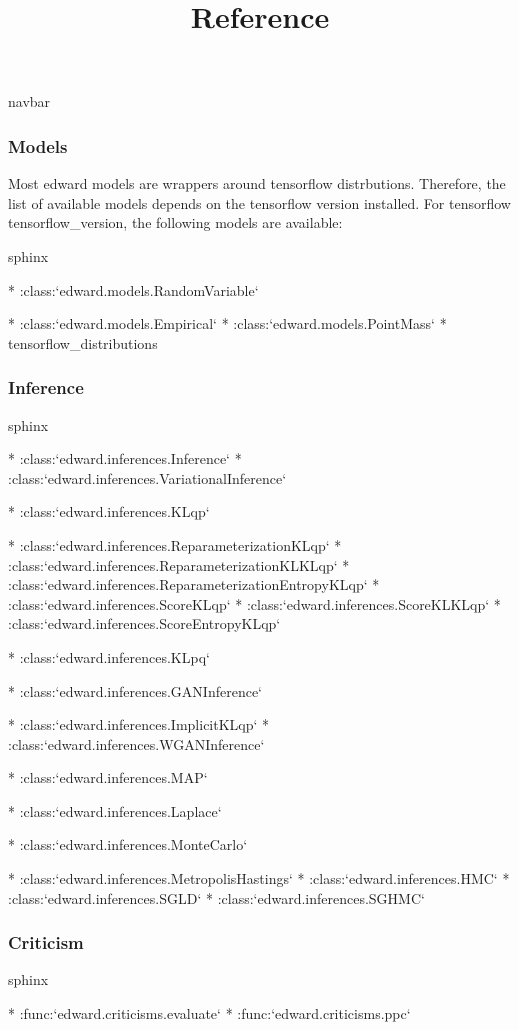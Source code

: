 \title{Reference}

{{navbar}}

\subsubsection{Models}

Most edward models are wrappers around tensorflow distrbutions. Therefore, the
list of available models depends on the tensorflow version installed. For
tensorflow {{tensorflow_version}}, the following models are available:

{{sphinx

* :class:`edward.models.RandomVariable`

  * :class:`edward.models.Empirical`
  * :class:`edward.models.PointMass`
  * {tensorflow_distributions}

}}

\subsubsection{Inference}

{{sphinx

* :class:`edward.inferences.Inference`
* :class:`edward.inferences.VariationalInference`

  * :class:`edward.inferences.KLqp`

    * :class:`edward.inferences.ReparameterizationKLqp`
    * :class:`edward.inferences.ReparameterizationKLKLqp`
    * :class:`edward.inferences.ReparameterizationEntropyKLqp`
    * :class:`edward.inferences.ScoreKLqp`
    * :class:`edward.inferences.ScoreKLKLqp`
    * :class:`edward.inferences.ScoreEntropyKLqp`


  * :class:`edward.inferences.KLpq`

  * :class:`edward.inferences.GANInference`

    * :class:`edward.inferences.ImplicitKLqp`
    * :class:`edward.inferences.WGANInference`

  * :class:`edward.inferences.MAP`

    * :class:`edward.inferences.Laplace`

* :class:`edward.inferences.MonteCarlo`

  * :class:`edward.inferences.MetropolisHastings`
  * :class:`edward.inferences.HMC`
  * :class:`edward.inferences.SGLD`
  * :class:`edward.inferences.SGHMC`

}}

\subsubsection{Criticism}

{{sphinx

* :func:`edward.criticisms.evaluate`
* :func:`edward.criticisms.ppc`

}}